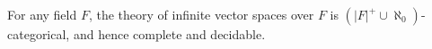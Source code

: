 For any field $F$, the theory of infinite vector spaces over $F$ is $(|F|^+ \cup \aleph_0)$-categorical, and hence complete and decidable.
